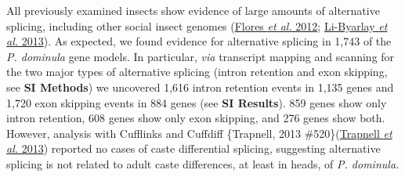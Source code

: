 All previously examined insects show evidence of large amounts of
alternative splicing, including other social insect genomes
(\protect\hyperlink{ux5fENREFux5f11}{Flores \textit{et al.} 2012};
\protect\hyperlink{ux5fENREFux5f32}{Li-Byarlay \textit{et al.} 2013}). As
expected, we found evidence for alternative splicing in 1,743 of the
\textit{P. dominula} gene models. In particular, \textit{via} transcript
mapping and scanning for the two major types of alternative splicing
(intron retention and exon skipping, see \textbf{SI Methods}) we
uncovered 1,616 intron retention events in 1,135 genes and 1,720 exon
skipping events in 884 genes (see \textbf{SI Results}). 859 genes show
only intron retention, 608 genes show only exon skipping, and 276 genes
show both. However, analysis with Cufflinks and Cuffdiff \{Trapnell,
2013 \#520\}(\protect\hyperlink{ux5fENREFux5f64}{Trapnell \textit{et al.}
2013}) reported no cases of caste differential splicing, suggesting
alternative splicing is not related to adult caste differences, at least
in heads, of \textit{P. dominula.}

